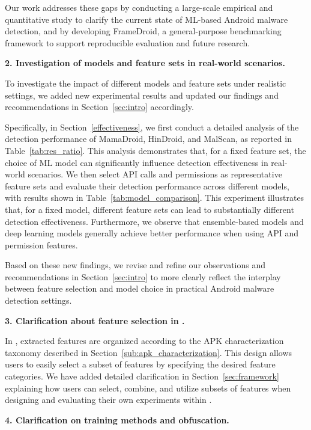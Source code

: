 Our work addresses these gaps by conducting a large-scale empirical and quantitative study to clarify the current state of ML-based Android malware detection, and by developing FrameDroid, a general-purpose benchmarking framework to support reproducible evaluation and future research.

\vspace{0.1cm}
\noindent \textbf{2. Investigation of models and feature sets in real-world scenarios.}

To investigate the impact of different models and feature sets under realistic settings, we added new experimental results and updated our findings and recommendations in Section~\ref{sec:intro} accordingly.

Specifically, in Section~\ref{effectiveness}, we first conduct a detailed analysis of the detection performance of MamaDroid, HinDroid, and MalScan, as reported in Table~\ref{tab:res_ratio}. This analysis demonstrates that, for a fixed feature set, the choice of ML model can significantly influence detection effectiveness in real-world scenarios.
We then select API calls and permissions as representative feature sets and evaluate their detection performance across different models, with results shown in Table~\ref{tab:model_comparison}. This experiment illustrates that, for a fixed model, different feature sets can lead to substantially different detection effectiveness. Furthermore, we observe that ensemble-based models and deep learning models generally achieve better performance when using API and permission features.

Based on these new findings, we revise and refine our observations and recommendations in Section~\ref{sec:intro} to more clearly reflect the interplay between feature selection and model choice in practical Android malware detection settings.

\vspace{0.1cm}
\noindent \textbf{3. Clarification about feature selection in \codename.}

In \codename, extracted features are organized according to the APK characterization taxonomy described in Section~\ref{sub:apk_characterization}. This design allows users to easily select a subset of features by specifying the desired feature categories.
We have added detailed clarification in Section~\ref{sec:framework} explaining how users can select, combine, and utilize subsets of features when designing and evaluating their own experiments within \codename.

\vspace{0.1cm}
\noindent \textbf{4. Clarification on training methods and obfuscation.}

